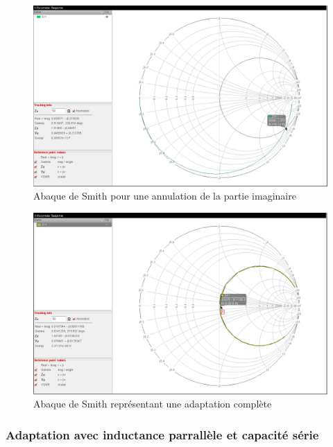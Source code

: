 \documentclass[a4paper]{article}
\begin{document}
\begin{figure}[!htb]
\begin{center}
  \includegraphics[width=\linewidth]{smith-capa-parallele-1st-adapt.png}
  \caption{Abaque de Smith pour une annulation de la partie imaginaire}
\end{center}
\end{figure}

\clearpage

\begin{figure}[!htb]
\begin{center}
  \includegraphics[width=\linewidth]{smith-induct-series-1st-adapt.png}
  \caption{Abaque de Smith repr\'esentant une adaptation compl\`ete}
\end{center}
\end{figure}

\subsubsection{Adaptation avec inductance parrall\`ele et capacit\'e s\'erie}
\end{document}
